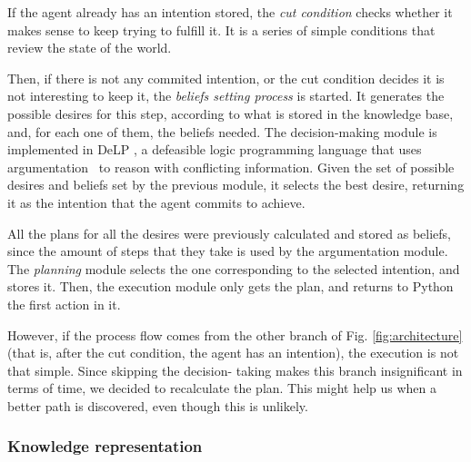     If the agent already has an intention stored, the \textit{cut condition}
    checks whether it makes sense to keep trying to fulfill it. It is a series
    of simple conditions that review the state of the world.

    Then, if there is not any commited intention, or the cut condition decides
    it is not interesting to keep it, the \textit{beliefs setting process} is
    started. It generates the possible desires for this step, according to what
    is stored in the knowledge base, and, for each one of them, the beliefs
    needed.  The decision-making module is implemented in
    DeLP\cite{Rotstein:2007} \cite{Ferretti:2008}, a defeasible logic
    programming language that uses argumentation \cite{DBLP:conf/comma/2008}\ to
    reason with conflicting information.  Given the set of possible desires and
    beliefs set by the previous module, it selects the best desire, returning it
    as the intention that the agent commits to achieve.

    All the plans for all the desires were previously calculated and stored as 
    beliefs, since the amount of steps that they take is used by the 
    argumentation module. The \textit{planning} module selects the one 
    corresponding to the selected intention, and stores it. Then, the 
    execution module only gets the plan, and returns to Python the first 
    action in it.

    However, if the process flow comes from the other branch of Fig. 
    \ref{fig:architecture} (that is, after the cut condition, the agent has an 
    intention), the execution is not that simple. Since skipping the decision-
    taking makes this branch insignificant in terms of time, we decided to 
    recalculate the plan. This might help us when a better path is discovered, 
    even though this is unlikely.

\subsubsection{Knowledge representation}





